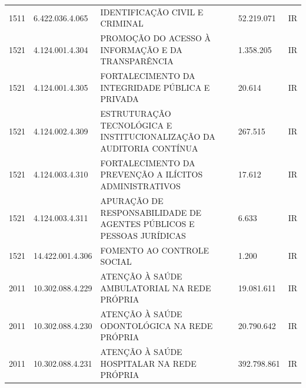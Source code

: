 \documentclass{article}
\begin{document}
\begin{longtable}[c]{m{1cm}|m{2cm}|m{10cm}|m{2cm}|m{1cm}}
\multicolumn{1}{C{1cm}|}{1511} & \multicolumn{1}{C{2cm}|}{6.422.036.4.065} & \multicolumn{1}{L{10cm}|}{IDENTIFICAÇÃO CIVIL E CRIMINAL} & \multicolumn{1}{R{2cm}|}{52.219.071} & \multicolumn{1}{C{1cm}}{IR} \\
\multicolumn{1}{C{1cm}|}{1521} & \multicolumn{1}{C{2cm}|}{4.124.001.4.304} & \multicolumn{1}{L{10cm}|}{PROMOÇÃO DO ACESSO À INFORMAÇÃO E DA TRANSPARÊNCIA} & \multicolumn{1}{R{2cm}|}{1.358.205} & \multicolumn{1}{C{1cm}}{IR} \\
\multicolumn{1}{C{1cm}|}{1521} & \multicolumn{1}{C{2cm}|}{4.124.001.4.305} & \multicolumn{1}{L{10cm}|}{FORTALECIMENTO DA INTEGRIDADE PÚBLICA E PRIVADA} & \multicolumn{1}{R{2cm}|}{20.614} & \multicolumn{1}{C{1cm}}{IR} \\
\multicolumn{1}{C{1cm}|}{1521} & \multicolumn{1}{C{2cm}|}{4.124.002.4.309} & \multicolumn{1}{L{10cm}|}{ESTRUTURAÇÃO TECNOLÓGICA E INSTITUCIONALIZAÇÃO DA AUDITORIA CONTÍNUA} & \multicolumn{1}{R{2cm}|}{267.515} & \multicolumn{1}{C{1cm}}{IR} \\
\multicolumn{1}{C{1cm}|}{1521} & \multicolumn{1}{C{2cm}|}{4.124.003.4.310} & \multicolumn{1}{L{10cm}|}{FORTALECIMENTO DA PREVENÇÃO A ILÍCITOS ADMINISTRATIVOS} & \multicolumn{1}{R{2cm}|}{17.612} & \multicolumn{1}{C{1cm}}{IR} \\
\multicolumn{1}{C{1cm}|}{1521} & \multicolumn{1}{C{2cm}|}{4.124.003.4.311} & \multicolumn{1}{L{10cm}|}{APURAÇÃO DE RESPONSABILIDADE DE AGENTES PÚBLICOS E PESSOAS JURÍDICAS} & \multicolumn{1}{R{2cm}|}{6.633} & \multicolumn{1}{C{1cm}}{IR} \\
\multicolumn{1}{C{1cm}|}{1521} & \multicolumn{1}{C{2cm}|}{14.422.001.4.306} & \multicolumn{1}{L{10cm}|}{FOMENTO AO CONTROLE SOCIAL} & \multicolumn{1}{R{2cm}|}{1.200} & \multicolumn{1}{C{1cm}}{IR} \\
\multicolumn{1}{C{1cm}|}{2011} & \multicolumn{1}{C{2cm}|}{10.302.088.4.229} & \multicolumn{1}{L{10cm}|}{ATENÇÃO À SAÚDE AMBULATORIAL NA REDE PRÓPRIA} & \multicolumn{1}{R{2cm}|}{19.081.611} & \multicolumn{1}{C{1cm}}{IR} \\
\multicolumn{1}{C{1cm}|}{2011} & \multicolumn{1}{C{2cm}|}{10.302.088.4.230} & \multicolumn{1}{L{10cm}|}{ATENÇÃO À SAÚDE ODONTOLÓGICA NA REDE PRÓPRIA} & \multicolumn{1}{R{2cm}|}{20.790.642} & \multicolumn{1}{C{1cm}}{IR} \\
\multicolumn{1}{C{1cm}|}{2011} & \multicolumn{1}{C{2cm}|}{10.302.088.4.231} & \multicolumn{1}{L{10cm}|}{ATENÇÃO À SAÚDE HOSPITALAR NA REDE PRÓPRIA} & \multicolumn{1}{R{2cm}|}{392.798.861} & \multicolumn{1}{C{1cm}}{IR} \\

\end{longtable}
\end{document}

